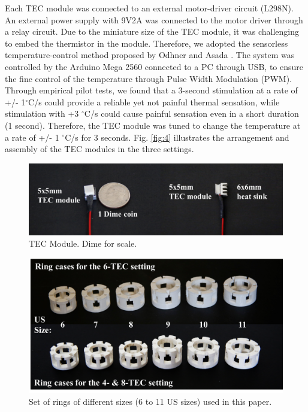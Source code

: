 \documentclass[preprint,12pt]{elsarticle}
\begin{document}
Each TEC module was connected to an external motor-driver circuit (L298N). An external power supply with 9V2A was connected to the motor driver through a relay circuit. Due to the miniature size of the TEC module, it was challenging to embed the thermistor in the module. Therefore, we adopted the sensorless temperature-control method proposed by Odhner and Asada \cite{18}. The system was controlled by the Arduino Mega 2560 connected to a PC through USB, to ensure the fine control of the temperature through Pulse Width Modulation (PWM). Through empirical pilot tests, we found that a 3-second stimulation at a rate of +/- 1$^{\circ}$C/s could provide a reliable yet not painful thermal sensation, while stimulation with +3 $^{\circ}$C/s could cause painful sensation even in a short duration (1 second). Therefore, the TEC module was tuned to change the temperature at a rate of +/- 1 $^{\circ}$C/s  for 3 seconds.  Fig. \ref{fig:4} illustrates the arrangement and assembly of the TEC modules in the three settings.


\begin{figure}[h]
  \centering
  \includegraphics[width=0.8\columnwidth]{img/fig2.png}
  \caption{TEC Module. Dime for scale.}
  \label{fig:2}
\end{figure}

\begin{figure}[h]
  \centering
  \includegraphics[width=0.8\columnwidth]{img/fig3.png}
  \caption{Set of rings of different sizes (6 to 11 US sizes) used in this paper.}
  \label{fig:3}
\end{figure}
\end{document}
